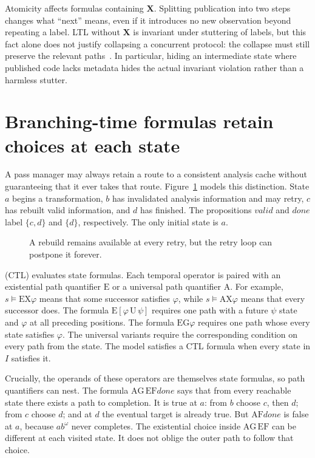 Atomicity affects formulas containing $\mathbf{X}$.
Splitting publication into two steps changes what \enquote{next} means, even if it introduces no new observation beyond repeating a label.
LTL without $\mathbf{X}$ is invariant under stuttering of labels, but this fact alone does not justify collapsing a concurrent protocol: the collapse must still preserve the relevant paths~\cite{baier-2008-model-checking}.
In particular, hiding an intermediate state where published code lacks metadata hides the actual invariant violation rather than a harmless stutter.

\section{Branching-time formulas retain choices at each state}
\label{sec:ch45-ctl}

A pass manager may always retain a route to a consistent analysis cache without guaranteeing that it ever takes that route.
Figure~\ref{fig:ch45-pass} models this distinction.
State $a$ begins a transformation, $b$ has invalidated analysis information and may retry, $c$ has rebuilt valid information, and $d$ has finished.
The propositions $\mathit{valid}$ and $\mathit{done}$ label $\{c,d\}$ and $\{d\}$, respectively.
The only initial state is $a$.

\begin{figure}[tbp]
\centering

\caption{A rebuild remains available at every retry, but the retry loop can postpone it forever.}
\label{fig:ch45-pass}
\end{figure}

 (CTL) evaluates state formulas.
Each temporal operator is paired with an existential path quantifier $\mathrm{E}$ or a universal path quantifier $\mathrm{A}$.
For example, $s\models\mathrm{EX}\varphi$ means that some successor satisfies $\varphi$, while $s\models\mathrm{AX}\varphi$ means that every successor does.
The formula $\mathrm{E}[\varphi\,\mathrm{U}\,\psi]$ requires one path with a future $\psi$ state and $\varphi$ at all preceding positions.
The formula $\mathrm{EG}\varphi$ requires one path whose every state satisfies $\varphi$.
The universal variants require the corresponding condition on every path from the state.
The model satisfies a CTL formula when every state in $I$ satisfies it.

Crucially, the operands of these operators are themselves state formulas, so path quantifiers can nest.
The formula $\mathrm{AG}\,\mathrm{EF}\mathit{done}$ says that from every reachable state there exists a path to completion.
It is true at $a$: from $b$ choose $c$, then $d$; from $c$ choose $d$; and at $d$ the eventual target is already true.
But $\mathrm{AF}\mathit{done}$ is false at $a$, because $ab^\omega$ never completes.
The existential choice inside $\mathrm{AG}\,\mathrm{EF}$ can be different at each visited state.
It does not oblige the outer path to follow that choice.

